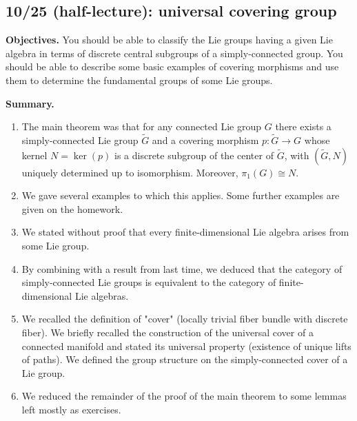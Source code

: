 \documentclass[reqno]{amsart} 
\begin{document}
\newpage
\subsection{10/25 (half-lecture): universal covering group}
\label{sec:org37094a7}
\textbf{Objectives.} You should be able to classify the Lie groups having a
given Lie algebra in terms of discrete central subgroups of a
simply-connected group.  You should be able to describe some basic
examples of covering morphisms and use them to determine the
fundamental groups of some Lie groups.

\textbf{Summary.}
\begin{enumerate}
\item The main theorem was that for any connected Lie group \(G\) there
exists a simply-connected Lie group \(\tilde{G}\) and a covering
morphism \(p : \tilde{G} \rightarrow G\) whose kernel \(N = \ker(p)\)
is a discrete subgroup of the center of \(\tilde{G}\), with
\((\tilde{G},N)\) uniquely determined up to isomorphism.  Moreover,
\(\pi_1(G) \cong N\).
\item We gave several examples to which this applies.  Some further
examples are given on the homework.
\item We stated without proof that every finite-dimensional Lie algebra
arises from some Lie group.
\item By combining with a result from last time, we deduced that the
category of simply-connected Lie groups is equivalent to the
category of finite-dimensional Lie algebras.
\item We recalled the definition of "cover" (locally trivial fiber bundle
with discrete fiber).  We briefly recalled the construction of the
universal cover of a connected manifold and stated its universal
property (existence of unique lifts of paths).  We defined the
group structure on the simply-connected cover of a Lie group.
\item We reduced the remainder of the proof of the main theorem to some
lemmas left mostly as exercises.
\end{enumerate}
\end{document}
